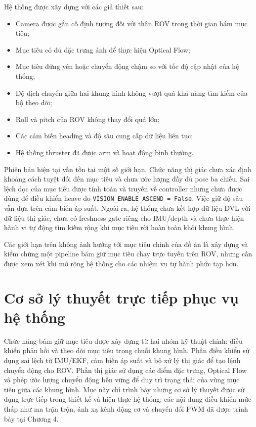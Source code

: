 \documentclass[../DoAn.tex]{subfiles}
\begin{document}
Hệ thống được xây dựng với các giả thiết sau:
\begin{itemize}
    \item Camera được gắn cố định tương đối với thân ROV trong thời gian bám mục tiêu;
    \item Mục tiêu có đủ đặc trưng ảnh để thực hiện Optical Flow;
    \item Mục tiêu đứng yên hoặc chuyển động chậm so với tốc độ cập nhật của hệ thống;
    \item Độ dịch chuyển giữa hai khung hình không vượt quá khả năng tìm kiếm của bộ theo dõi;
    \item Roll và pitch của ROV không thay đổi quá lớn;
    \item Các cảm biến heading và độ sâu cung cấp dữ liệu liên tục;
    \item Hệ thống thruster đã được arm và hoạt động bình thường.
\end{itemize}

Phiên bản hiện tại vẫn tồn tại một số giới hạn. Chức năng thị giác chưa xác định khoảng cách tuyệt đối đến mục tiêu và chưa ước lượng đầy đủ pose ba chiều. Sai lệch dọc của mục tiêu được tính toán và truyền về controller nhưng chưa được dùng để điều khiển heave do \texttt{VISION\_ENABLE\_ASCEND = False}. Việc giữ độ sâu vẫn dựa trên cảm biến áp suất. Ngoài ra, hệ thống chưa kết hợp dữ liệu DVL với dữ liệu thị giác, chưa có freshness gate riêng cho IMU/depth và chưa thực hiện hành vi tự động tìm kiếm rộng khi mục tiêu rời hoàn toàn khỏi khung hình.

Các giới hạn trên không ảnh hưởng tới mục tiêu chính của đồ án là xây dựng và kiểm chứng một pipeline bám giữ mục tiêu chạy trực tuyến trên ROV, nhưng cần được xem xét khi mở rộng hệ thống cho các nhiệm vụ tự hành phức tạp hơn.


\section{Cơ sở lý thuyết trực tiếp phục vụ hệ thống}

Chức năng bám giữ mục tiêu được xây dựng từ hai nhóm kỹ thuật chính: điều khiển phản hồi và theo dõi mục tiêu trong chuỗi khung hình. Phần điều khiển sử dụng sai lệch từ IMU/EKF, cảm biến áp suất và bộ xử lý thị giác để tạo lệnh chuyển động cho ROV. Phần thị giác sử dụng các điểm đặc trưng, Optical Flow và phép ước lượng chuyển động bền vững để duy trì trạng thái của vùng mục tiêu giữa các khung hình. Mục này chỉ trình bày những cơ sở lý thuyết được sử dụng trực tiếp trong thiết kế và hiện thực hệ thống; các nội dung điều khiển mức thấp như ma trận trộn, ánh xạ kênh động cơ và chuyển đổi PWM đã được trình bày tại Chương 4.
\end{document}
